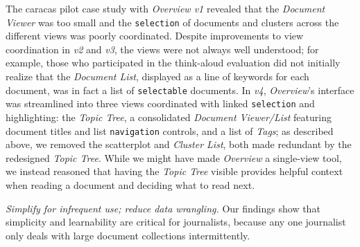 The {\sc caracas} pilot case study with {\it Overview v1} revealed that the {\it Document Viewer} was too small and the {\tt selection} of documents and clusters across the different views was poorly coordinated.
Despite improvements to view coordination in {\it v2} and {\it v3}, the views were not always well understood; for example, those who participated in the think-aloud evaluation did not initially realize that the {\it Document List}, displayed as a line of keywords for each document, was in fact a list of {\tt selectable} documents.
In {\it v4}, {\it Overview}'s interface was streamlined into three views coordinated with linked {\tt selection} and highlighting: the {\it Topic Tree}, a consolidated {\it Document Viewer/List} featuring document titles and list {\tt navigation} controls, and a list of {\it Tags}; as described above, we removed the scatterplot and {\it Cluster List}, both made redundant by the redesigned {\it Topic Tree}.
While we might have made {\it Overview} a single-view tool, we instead reasoned that having the {\it Topic Tree} visible provides helpful context when reading a document and deciding what to read next.

{\it Simplify for infrequent use; reduce data wrangling.}
Our findings show that simplicity and learnability are critical for journalists, because any one journalist only deals with large document collections intermittently.

